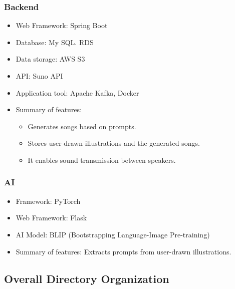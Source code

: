 \documentclass[conference]{IEEEtran}
\begin{document}
 \subsubsection{Backend}
\begin{itemize}
    \item Web Framework: Spring Boot\\
    \item Database: My SQL. RDS\\
    \item Data storage: AWS S3\\
    \item API: Suno API\\
    \item Application tool: Apache Kafka, Docker\\
    \item Summary of features:
\begin{itemize}
    \item Generates songs based on prompts.\\
    \item Stores user-drawn illustrations and the generated songs.\\
    \item It enables sound transmission between speakers.\\
\end{itemize}
\end{itemize}

\subsubsection{AI}
\begin{itemize}
    \item Framework: PyTorch\\
    \item Web Framework: Flask\\
    \item AI Model: BLIP (Bootstrapping Language-Image Pre-training)\\
    \item Summary of features: Extracts prompts from user-drawn illustrations.\\
\end{itemize}


\subsection{Overall Directory Organization}
\end{document}
